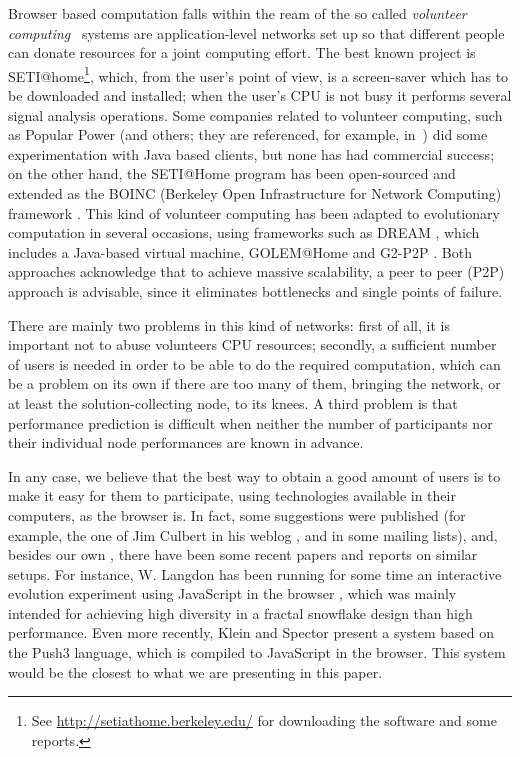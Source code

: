 \documentclass[runningheads,a4paper]{llncs}
\begin{document}
Browser based computation falls within the ream of the so called  {\em volunteer
computing}~\cite{sarmenta-bayanihan,hpvc} systems are
application-level networks set up so that different people
can donate resources for a joint computing  effort.
The best known project is SETI@home\footnote{See
\url{http://setiathome.berkeley.edu/} for downloading the software  and some
reports.}, which, from the user's point of view, is a screen-saver which has to be
downloaded and installed; when the user's CPU is not busy it performs
several signal analysis operations.
Some companies related to volunteer computing, such as Popular Power (and
others; they are referenced,
for example, in~\cite{Cappello}) did some experimentation with Java based
clients, but none has had commercial success; on the other hand, the
SETI@Home program has been open-sourced and extended as the BOINC
(Berkeley Open Infrastructure for Network Computing) 
framework \cite{boinc_grid04}. This kind of volunteer computing has
been adapted to evolutionary computation in several occasions, using
frameworks such as DREAM \cite{LNCS2439:ID197:pp665}, which includes a
Java-based virtual machine, GOLEM@Home and G2-P2P \cite{G2-P2P}. Both approaches
acknowledge that to achieve massive scalability, a peer to peer (P2P)
approach is advisable, since it eliminates bottlenecks and single
points of failure. 

There are mainly two problems in this kind of networks: first of all,
it is important not to abuse volunteers CPU resources; secondly, a
sufficient number of users is needed in order to be able to do the
required computation, which can be a problem on its own if there are
too many of them, bringing the network, or at least the
solution-collecting node, to its knees. A third problem is that
performance prediction is difficult when neither the number of
participants nor their individual node performances are known in
advance.

In any case, we believe that the best way to obtain a good amount of
users is to make it easy for them to participate, using technologies
available in their computers, as the browser is. In fact, some
suggestions were published (for example, the one of Jim Culbert in his
weblog \cite{ajax:dc}, and in some mailing lists), and, besides our
own \cite{gecco07:workshop:dcor}, there have been some recent papers
and reports on similar setups. For instance, W. Langdon has been
running for some time an interactive evolution experiment using
JavaScript in the browser \cite{langdon:2005:metas}, which was mainly
intended for achieving high diversity in a fractal snowflake design
than high performance. Even more recently, Klein and Spector
\cite{unwitting-ec} present a system based on the Push3 language,
which is compiled to JavaScript in the browser. This system would be
the closest to what we are presenting in this paper. 
\end{document}
